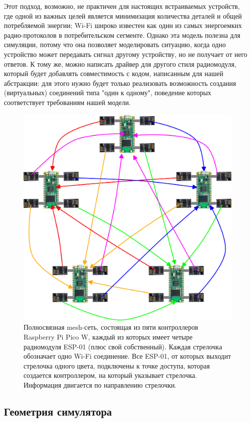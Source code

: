 \documentclass[%
]{article}
\begin{document}
Этот подход, возможно, не практичен для настоящих встраиваемых устройств,
где одной из важных целей является минимизация количества деталей
и общей потребляемой энергии;
Wi-Fi широко известен как один из самых энергоемких радио-протоколов в потребительском сегменте.
Однако эта модель полезна для симуляции,
потому что она позволяет моделировать ситуацию,
когда одно устройство может передавать сигнал другому устройству,
но не получает от него ответов.
К тому же,
можно написать драйвер для другого стиля радиомодуля,
который будет добавлять совместимость с кодом,
написанным для нашей абстракции:
для этого нужно будет только реализовать возможность создания (виртуальных)
соединений типа "один к одному",
поведение которых соответствует требованиям нашей модели.

\begin{figure}
  \centering
  \includegraphics[width=0.8\linewidth]{connections}
  \caption{Полносвязная mesh-сеть, состоящая из пяти контроллеров Raspberry Pi Pico W, каждый из которых имеет четыре радиомодуля ESP-01 (плюс свой собственный). Каждая стрелочка обозначает одно Wi-Fi соединение. Все ESP-01, от которых выходит стрелочка одного цвета, подключены к точке доступа, которая создается контроллером, на который указывает стрелочка. Информация двигается по направлению стрелочки.}
  \label{fig:connections}
\end{figure}


\subsection{Геометрия симулятора}
\end{document}
